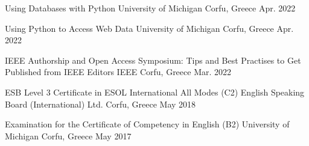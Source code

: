 \begin{cventries}

  \cventry
    {Using Databases with Python} %
    {University of Michigan} %
    {Corfu, Greece} %
    {Apr. 2022} %
    {
      \begin{cvitems} %
      \end{cvitems}
    }


  \cventry
    {Using Python to Access Web Data} %
    {University of Michigan} %
    {Corfu, Greece} %
    {Apr. 2022} %
    {
      \begin{cvitems} %
      \end{cvitems}
    }


  \cventry
    {IEEE Authorship and Open Access Symposium: Tips and Best Practises to Get Published from IEEE Editors} %
    {IEEE} %
    {Corfu, Greece} %
    {Mar. 2022} %
    {
      \begin{cvitems} %
      \end{cvitems}
    }


  \cventry
    {ESB Level 3 Certificate in ESOL International All Modes (C2)} %
    {English Speaking Board (International) Ltd.} %
    {Corfu, Greece} %
    {May 2018} %
    {
      \begin{cvitems} %
      \end{cvitems}
    }


  \cventry
    {Examination for the Certificate of Competency in English (B2)} %
    {University of Michigan} %
    {Corfu, Greece} %
    {May 2017} %
    {
      \begin{cvitems} %
      \end{cvitems}
    }


\end{cventries}
